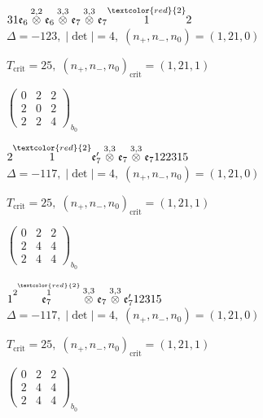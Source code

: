 \documentclass[10pt]{article}
\begin{document}
\smallskip

$31\mathfrak{e}_6\overset{2,2}{\otimes}\mathfrak{e}_6\overset{3,3}{\otimes}\mathfrak{e}_7\overset{3,3}{\otimes}\mathfrak{e}_7\overset{\textcolor{red}{2}}{1}2$ \quad $\Delta=-123,\; |\det|=4,\; (n_+,n_-,n_0)=(1,21,0)$

\hspace{1em}$T_{\text{crit}}=25,\; (n_+,n_-,n_0)_{\text{crit}}=(1,21,1)$

\hspace{2em}$\left(\begin{smallmatrix}0 & 2 & 2 \\ 2 & 0 & 2 \\ 2 & 2 & 4\end{smallmatrix}\right)_{\!b_0}$

\smallskip

$2\overset{\textcolor{red}{2}}{1}\mathfrak{e}_7'\overset{3,3}{\otimes}\mathfrak{e}_7\overset{3,3}{\otimes}\mathfrak{e}_7122315$ \quad $\Delta=-117,\; |\det|=4,\; (n_+,n_-,n_0)=(1,21,0)$

\hspace{1em}$T_{\text{crit}}=25,\; (n_+,n_-,n_0)_{\text{crit}}=(1,21,1)$

\hspace{2em}$\left(\begin{smallmatrix}0 & 2 & 2 \\ 2 & 4 & 4 \\ 2 & 4 & 4\end{smallmatrix}\right)_{\!b_0}$

\smallskip

$1\overset{2\overset{\textcolor{red}{2}}{1}}{\mathfrak{e}_7}\overset{3,3}{\otimes}\mathfrak{e}_7\overset{3,3}{\otimes}\mathfrak{e}_7'12315$ \quad $\Delta=-117,\; |\det|=4,\; (n_+,n_-,n_0)=(1,21,0)$

\hspace{1em}$T_{\text{crit}}=25,\; (n_+,n_-,n_0)_{\text{crit}}=(1,21,1)$

\hspace{2em}$\left(\begin{smallmatrix}0 & 2 & 2 \\ 2 & 4 & 4 \\ 2 & 4 & 4\end{smallmatrix}\right)_{\!b_0}$
\end{document}
